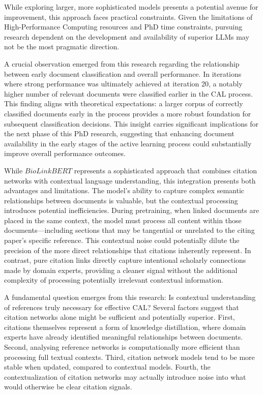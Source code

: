 \documentclass[10pt, english]{article}
\begin{document}
While exploring larger, more sophisticated models presents a potential avenue for improvement, this approach faces practical constraints. Given the limitations of High-Performance Computing resources and PhD time constraints, pursuing research dependent on the development and availability of superior LLMs may not be the most pragmatic direction.

A crucial observation emerged from this research regarding the relationship between early document classification and overall performance. In iterations where strong performance was ultimately achieved at iteration 20, a notably higher number of relevant documents were classified earlier in the CAL process. This finding aligns with theoretical expectations: a larger corpus of correctly classified documents early in the process provides a more robust foundation for subsequent classification decisions. This insight carries significant implications for the next phase of this PhD research, suggesting that enhancing document availability in the early stages of the active learning process could substantially improve overall performance outcomes.

While $BioLinkBERT$ represents a sophisticated approach that combines citation networks with contextual language understanding, this integration presents both advantages and limitations. The model's ability to capture complex semantic relationships between documents is valuable, but the contextual processing introduces potential inefficiencies. During pretraining, when linked documents are placed in the same context, the model must process all content within those documents—including sections that may be tangential or unrelated to the citing paper's specific reference. This contextual noise could potentially dilute the precision of the more direct relationships that citations inherently represent. In contrast, pure citation links directly capture intentional scholarly connections made by domain experts, providing a cleaner signal without the additional complexity of processing potentially irrelevant contextual information.

A fundamental question emerges from this research: Is contextual understanding of references truly necessary for effective CAL? Several factors suggest that citation networks alone might be sufficient and potentially superior. First, citations themselves represent a form of knowledge distillation, where domain experts have already identified meaningful relationships between documents. Second, analysing reference networks is computationally more efficient than processing full textual contexts. Third, citation network models tend to be more stable when updated, compared to contextual models. Fourth, the contextualization of citation networks may actually introduce noise into what would otherwise be clear citation signals.
\end{document}
